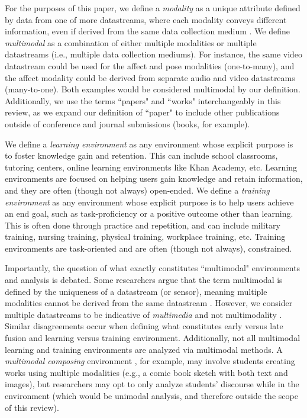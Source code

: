 \documentclass[manuscript,screen,review]{acmart}
\begin{document}

For the purposes of this paper, we define a \textit{modality} as a unique attribute defined by data from one of more datastreams, where each modality conveys different information, even if derived from the same data collection medium \cite{Ochoa?}. We define \textit{multimodal} as a combination of either multiple modalities or multiple datastreams (i.e., multiple data collection mediums). For instance, the same video datastream could be used for the affect and pose modalities (one-to-many), and the affect modality could be derived from separate audio and video datastreams (many-to-one). Both examples would be considered multimodal by our definition. Additionally, we use the terms ``papers" and ``works" interchangeably in this review, as we expand our definition of ``paper" to include other publications outside of conference and journal submissions (books, for example).
 
We define a \textit{learning environment} as any environment whose explicit purpose is to foster knowledge gain and retention. This can include school classrooms, tutoring centers, online learning environments like Khan Academy, etc. Learning environments are focused on helping users gain knowledge and retain information, and they are often (though not always) open-ended. We define a \textit{training environment} as any environment whose explicit purpose is to help users achieve an end goal, such as task-proficiency or a positive outcome other than learning. This is often done through practice and repetition, and can include military training, nursing training, physical training, workplace training, etc. Training environments are task-oriented and are often (though not always), constrained. 

Importantly, the question of what exactly constitutes ``multimodal" environments and analysis is debated. Some researchers argue that the term multimodal is defined by the uniqueness of a datastream (or sensor), meaning multiple modalities cannot be derived from the same datastream \cite{}. However, we consider multiple datastreams to be indicative of \textit{multimedia} and not multimodality \cite{}. Similar disagreements occur when defining what constitutes early versus late fusion and learning versus training environment. Additionally, not all multimodal learning and training environments are analyzed via multimodal methods. A \textit{multimodal composing} environment \cite{}, for example, may involve students creating works using multiple modalities (e.g., a comic book sketch with both text and images), but researchers may opt to only analyze students' discourse while in the environment (which would be unimodal analysis, and therefore outside the scope of this review). 
\end{document}
